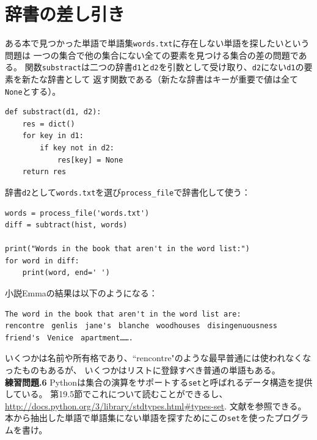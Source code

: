 \documentclass[a4j,12pt,makeidx]{jbook}
\newcommand{\tp}{\thechapter}
\begin{document}
\section{辞書の差し引き}
ある本で見つかった単語で単語集{\tt words.txt}に存在しない単語を探したいという問題は
一つの集合で他の集合にない全ての要素を見つける集合の差の問題である。
関数{\tt substract}は二つの辞書{\tt d1}と{\tt d2}を引数として受け取り、{\tt d2}にない{\tt d1}の要素を新たな辞書として
返す関数である（新たな辞書はキーが重要で値は全て{\tt None}とする）。
\begin{verbatim}
def substract(d1, d2):
    res = dict()
    for key in d1:
        if key not in d2:
            res[key] = None
    return res
\end{verbatim}
辞書{\tt d2}として{\tt words.txt}を選び{\tt process\_file}で辞書化して使う：
\begin{verbatim}
words = process_file('words.txt')
diff = subtract(hist, words)

print("Words in the book that aren't in the word list:")
for word in diff:
    print(word, end=' ')
\end{verbatim}
小説Emmaの結果は以下のようになる：
\begin{verbatim}
The word in the book that aren't in the word list are:
rencontre　genlis　jane's　blanche　woodhouses　disingenuousness
friend's　Venice　apartment…….
\end{verbatim}
いくつかは名前や所有格であり、``rencontre"のような最早普通には使われなくなったものもあるが、
いくつかはリストに登録すべき普通の単語もある。\\

\noindent
{\bf 練習問題\tp.6} Pythonは集合の演算をサポートする{\tt set}と呼ばれるデータ構造を提供している。 
第19.5節でこれについて読むことができるし、\url{http://docs.python.org/3/library/stdtypes.html#types-set}.
文献を参照できる。
本から抽出した単語で単語集にない単語を探すためにこの{\tt set}を使ったプログラムを書け。
%
\end{document}
